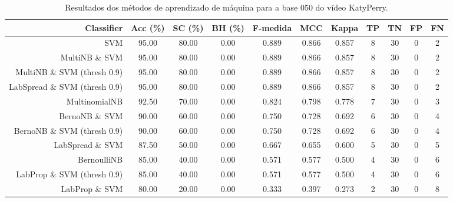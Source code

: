 \begin{table}[!htb]
\centering
\caption{Resultados dos métodos de aprendizado de máquina para a base 050 do vídeo KatyPerry.}
\label{tab:KatyPerry-050}
\begin{tabular}{r|c|c|c|c|c|c|c|c|c|c}
\hline\hline
Classifier & Acc (\%) & SC (\%) & BH (\%) & F-medida & MCC & Kappa & TP & TN & FP & FN \\ \hline
SVM & 95.00 & 80.00 & 0.00 & 0.889 & 0.866 & 0.857 & 8 & 30 & 0 & 2 \\ 
MultiNB \& SVM & 95.00 & 80.00 & 0.00 & 0.889 & 0.866 & 0.857 & 8 & 30 & 0 & 2 \\ 
MultiNB \& SVM (thresh 0.9) & 95.00 & 80.00 & 0.00 & 0.889 & 0.866 & 0.857 & 8 & 30 & 0 & 2 \\ 
LabSpread \& SVM (thresh 0.9) & 95.00 & 80.00 & 0.00 & 0.889 & 0.866 & 0.857 & 8 & 30 & 0 & 2 \\ 
MultinomialNB & 92.50 & 70.00 & 0.00 & 0.824 & 0.798 & 0.778 & 7 & 30 & 0 & 3 \\ 
BernoNB \& SVM & 90.00 & 60.00 & 0.00 & 0.750 & 0.728 & 0.692 & 6 & 30 & 0 & 4 \\ 
BernoNB \& SVM (thresh 0.9) & 90.00 & 60.00 & 0.00 & 0.750 & 0.728 & 0.692 & 6 & 30 & 0 & 4 \\ 
LabSpread \& SVM & 87.50 & 50.00 & 0.00 & 0.667 & 0.655 & 0.600 & 5 & 30 & 0 & 5 \\ 
BernoulliNB & 85.00 & 40.00 & 0.00 & 0.571 & 0.577 & 0.500 & 4 & 30 & 0 & 6 \\ 
LabProp \& SVM (thresh 0.9) & 85.00 & 40.00 & 0.00 & 0.571 & 0.577 & 0.500 & 4 & 30 & 0 & 6 \\ 
LabProp \& SVM & 80.00 & 20.00 & 0.00 & 0.333 & 0.397 & 0.273 & 2 & 30 & 0 & 8 \\ 
\hline\hline
\end{tabular}
\end{table}
